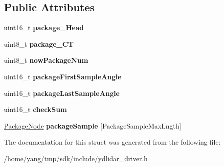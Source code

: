 \subsection*{Public Attributes}
\begin{DoxyCompactItemize}
\item 
uint16\+\_\+t {\bfseries package\+\_\+\+Head}\hypertarget{structnode__package_a6d48d3a1d1ef718065a82e7495fa2b26}{}\label{structnode__package_a6d48d3a1d1ef718065a82e7495fa2b26}

\item 
uint8\+\_\+t {\bfseries package\+\_\+\+CT}\hypertarget{structnode__package_a3be7b81a7cc4b7ef7beb816ccd414579}{}\label{structnode__package_a3be7b81a7cc4b7ef7beb816ccd414579}

\item 
uint8\+\_\+t {\bfseries now\+Package\+Num}\hypertarget{structnode__package_aad0a75920ad5c1393f1b00904ece2d67}{}\label{structnode__package_aad0a75920ad5c1393f1b00904ece2d67}

\item 
uint16\+\_\+t {\bfseries package\+First\+Sample\+Angle}\hypertarget{structnode__package_ac224f6450e8bd5bd069149babc37e1c4}{}\label{structnode__package_ac224f6450e8bd5bd069149babc37e1c4}

\item 
uint16\+\_\+t {\bfseries package\+Last\+Sample\+Angle}\hypertarget{structnode__package_af5768e03270d3b7d7f58b3b82156dc2e}{}\label{structnode__package_af5768e03270d3b7d7f58b3b82156dc2e}

\item 
uint16\+\_\+t {\bfseries check\+Sum}\hypertarget{structnode__package_a4b6d9990da9343143161aae929bb986e}{}\label{structnode__package_a4b6d9990da9343143161aae929bb986e}

\item 
\hyperlink{struct_package_node}{Package\+Node} {\bfseries package\+Sample} \mbox{[}Package\+Sample\+Max\+Lngth\mbox{]}\hypertarget{structnode__package_a284fb0bbde964f2d43661ce6dcd8bca8}{}\label{structnode__package_a284fb0bbde964f2d43661ce6dcd8bca8}

\end{DoxyCompactItemize}


The documentation for this struct was generated from the following file\+:\begin{DoxyCompactItemize}
\item 
/home/yang/tmp/sdk/include/ydlidar\+\_\+driver.\+h\end{DoxyCompactItemize}
